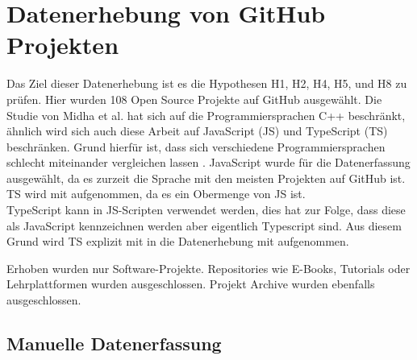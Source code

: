\chapter{Datenerhebung von GitHub Projekten} \label{kap:Datenerhebung}

Das Ziel dieser Datenerhebung ist es die Hypothesen H1, H2, H4, H5, und H8 zu prüfen.
Hier wurden 108 Open Source Projekte auf GitHub ausgewählt.
Die Studie von Midha et al. hat sich auf die Programmiersprachen C++ beschränkt, ähnlich wird sich
auch diese Arbeit auf JavaScript (JS) und TypeScript (TS) beschränken. Grund hierfür ist, dass
sich verschiedene Programmiersprachen schlecht miteinander vergleichen lassen
\cite{midhaFactorsAffectingSuccess2012}.
JavaScript wurde für die Datenerfassung ausgewählt, da es zurzeit die Sprache mit den meisten
Projekten auf GitHub ist.
TS wird mit aufgenommen, da es ein Obermenge von JS ist.\\ TypeScript kann in JS-Scripten verwendet
werden, dies hat zur Folge, dass diese als JavaScript kennzeichnen werden aber eigentlich Typescript sind. 
Aus diesem Grund wird TS explizit mit in die Datenerhebung mit aufgenommen.

Erhoben wurden nur Software-Projekte. Repositories wie E-Books, Tutorials oder Lehrplattformen wurden
ausgeschlossen. Projekt Archive wurden ebenfalls ausgeschlossen.




\section{Manuelle Datenerfassung}\label{sec:manuelle_datenerfassung}

